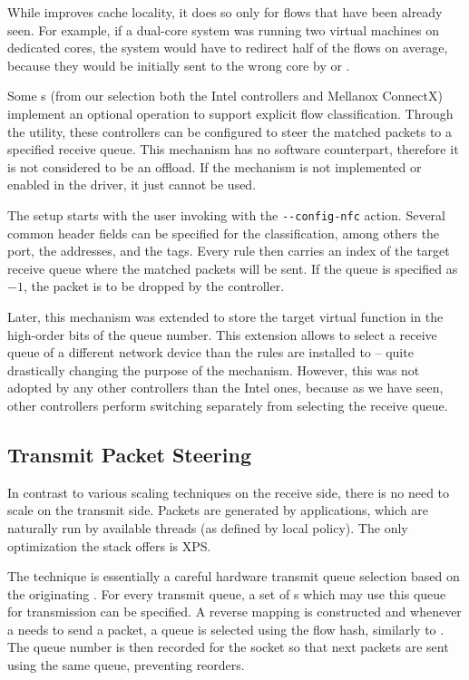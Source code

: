 While  improves cache locality, it does so only for flows that have
been already seen. For example, if a dual-core system was running two virtual
machines on dedicated  cores, the
system would have to redirect half of the flows on average, because they would
be initially sent to the wrong  core by  or .

Some s (from our selection both the Intel controllers and Mellanox ConnectX)
implement an optional  operation to support explicit flow
classification. Through the  utility, these controllers can be
configured to steer the matched packets to a specified receive queue. This mechanism
has no software counterpart, therefore it is not considered to be an offload.
If the mechanism is not implemented or enabled in the  driver, it just
cannot be used.

The setup starts with the user invoking  with the \Verb|--config-nfc|
action. Several common header fields can be specified for the
classification, among others the  port, the  addresses, and the  tags.
Every rule then carries an index of the target receive queue where the matched
packets will be sent. If the queue is specified as $-1$, the packet is to be dropped by the
controller.

Later, this mechanism was extended to store the target virtual function in the
high-order bits of the queue number. This extension allows to select a receive
queue of a different network device than the rules are installed to -- quite
drastically changing the purpose of the mechanism. However, this was not
adopted by any other controllers than the Intel ones, because as we have seen, other
controllers perform switching separately from selecting the receive queue.

\subsection{Transmit Packet Steering}

In contrast to various scaling techniques on the receive side, there is no need
to scale on the transmit side. Packets are generated by applications, which are
naturally run by available  threads (as defined by local policy). The
only optimization the stack offers is \acrfull{XPS}.

The technique is essentially a careful hardware transmit queue selection based on the
originating . For every transmit queue, a set of s which may use
this queue for transmission can be specified. A reverse mapping is constructed
and whenever a  needs to send a packet, a queue is selected
using the flow hash, similarly to . The queue number is
then recorded for the socket so that next packets are sent using the same
queue, preventing reorders.

